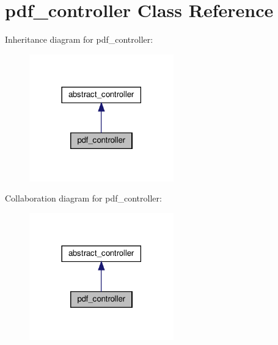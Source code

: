 \hypertarget{classpdf__controller}{}\section{pdf\+\_\+controller Class Reference}
\label{classpdf__controller}


Inheritance diagram for pdf\+\_\+controller\+:\nopagebreak
\begin{figure}[H]
\begin{center}
\leavevmode
\includegraphics[width=177pt]{classpdf__controller__inherit__graph}
\end{center}
\end{figure}


Collaboration diagram for pdf\+\_\+controller\+:\nopagebreak
\begin{figure}[H]
\begin{center}
\leavevmode
\includegraphics[width=177pt]{classpdf__controller__coll__graph}
\end{center}
\end{figure}
